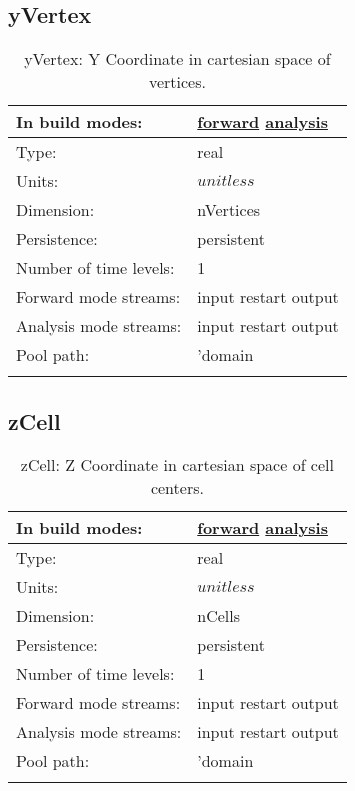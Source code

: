 \subsection[yVertex]{yVertex}
\label{subsec:var_sec_mesh_yVertex}
\begin{center}
\begin{longtable}{| p{2.0in} | p{4.0in} |}
        \hline 
        In build modes: & \hyperref[subsec:forward_var_tab_mesh]{forward} \hyperref[subsec:analysis_var_tab_mesh]{analysis} \\
        \hline 
        Type: & real \\
        \hline 
        Units: & $unitless$ \\
        \hline 
        Dimension: & nVertices \\
        \hline 
        Persistence: & persistent \\
        \hline 
        Number of time levels: & 1 \\
        \hline 
		 Forward mode streams: &  input restart output \\
        \hline 
		 Analysis mode streams: &  input restart output \\
        \hline 
            Pool path: & 'domain %
 \\
		 \hline 
    \caption{yVertex: Y Coordinate in cartesian space of vertices.}
\end{longtable}
\end{center}
\subsection[zCell]{zCell}
\label{subsec:var_sec_mesh_zCell}
\begin{center}
\begin{longtable}{| p{2.0in} | p{4.0in} |}
        \hline 
        In build modes: & \hyperref[subsec:forward_var_tab_mesh]{forward} \hyperref[subsec:analysis_var_tab_mesh]{analysis} \\
        \hline 
        Type: & real \\
        \hline 
        Units: & $unitless$ \\
        \hline 
        Dimension: & nCells \\
        \hline 
        Persistence: & persistent \\
        \hline 
        Number of time levels: & 1 \\
        \hline 
		 Forward mode streams: &  input restart output \\
        \hline 
		 Analysis mode streams: &  input restart output \\
        \hline 
            Pool path: & 'domain %
 \\
		 \hline 
    \caption{zCell: Z Coordinate in cartesian space of cell centers.}
\end{longtable}
\end{center}
